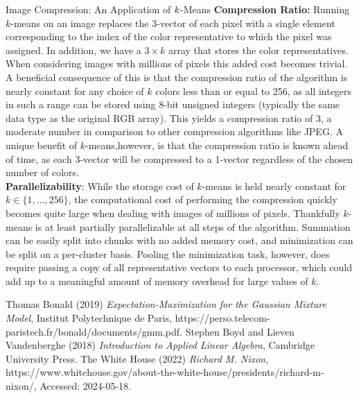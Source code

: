 \documentclass{article}
\begin{document}
\begin{section}{Image Compression: An Application of $\boldmath{k}$-Means}
\textbf{Compression Ratio:} Running $k$-means on an image replaces the 3-vector of each pixel with a single element corresponding to the index of the color representative to which the pixel was assigned. In addition, we have a $3\times k$ array that stores the color representatives. When considering images with millions of pixels this added cost becomes trivial. A beneficial consequence of this is that the compression ratio of the algorithm is nearly constant for any choice of $k$ colors less than or equal to 256, as all integers in such a range can be stored using 8-bit unsigned integers (typically the same data type as the original RGB array). This yields a compression ratio of 3, a moderate number in comparison to other compression algorithms like JPEG.  A unique benefit of $k$-means,however, is that the compression ratio is known ahead of time, as each 3-vector will be compressed to a 1-vector regardless of the chosen number of colors.\\

\textbf{Parallelizability}: While the storage cost of $k$-means is held nearly constant for $k\in\{1,\ldots,256\}$, the computational cost of performing the compression quickly becomes quite large when dealing with images of millions of pixels. Thankfully $k$-means is at least partially parallelizable at all steps of the algorithm. Summation can be easily split into chunks with no added memory cost, and minimization can be split on a per-cluster basis. Pooling the minimization task, however, does require passing a copy of all representative vectors to each processor, which could add up to a meaningful amount of memory overhead for large values of $k$.
\end{section}
\begin{thebibliography}{3}
Thomas Bonald (2019) \emph{Expectation-Maximization for the Gaussian Mixture Model}, Institut Polytechnique de Paris, https://perso.telecom-paristech.fr/bonald/documents/gmm.pdf.
Stephen Boyd and Lieven Vandenberghe (2018) \emph{Introduction to Applied Linear Algebra}, Cambridge University Press.
The White House (2022) \emph{Richard M. Nixon}, https://www.whitehouse.gov/about-the-white-house/presidents/richard-m-nixon/, Accessed: 2024-05-18.
\end{thebibliography}
\end{document}
